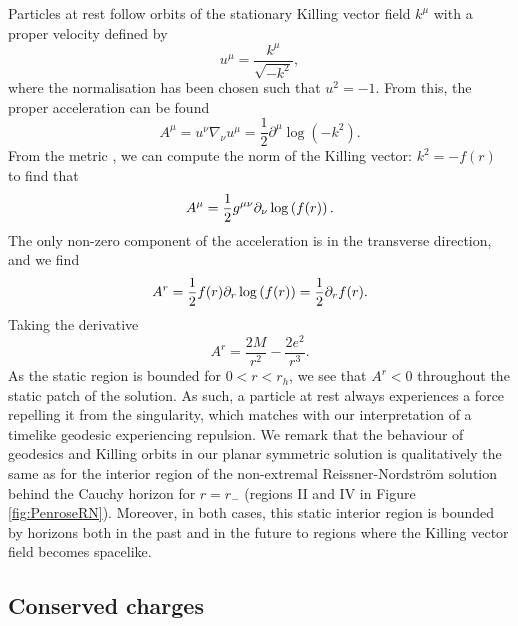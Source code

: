 Particles at rest follow orbits of the stationary Killing vector field $k^\mu$ with a proper velocity defined by
\begin{equation*}
    u^\mu = \frac{k^\mu}{\sqrt{-k^2}},
\end{equation*}
where the normalisation has been chosen such that $u^2 = -1$. From this, the proper acceleration can be found
\begin{equation}
\label{eq:propacc}
    A^\mu = u^\nu \nabla_\nu u^\mu = \frac{1}{2} \partial^\mu \log(-k^2).
\end{equation}
From the metric , we can compute the norm of the Killing vector: $k^2 = -f(r)$ to find that
\begin{equation}
\label{eq:properacccomp}
    A^\mu = \frac{1}{2} g^{\mu \nu} \partial_\nu \log \left( f(r) \right).
\end{equation}
The only non-zero component of the acceleration is in the transverse direction, and we find
\begin{equation*}
        A^r = \frac{1}{2} f(r)
 \partial_r \log \left( f(r) \right)
 = \frac{1}{2} \partial_r f(r).
\end{equation*}
Taking the derivative
\begin{equation}
A^r = \frac{2M}{r^2} - \frac{2e^2}{r^3}.
\end{equation}
As the static region is bounded for $0 < r < r_h$, we see that $A^r < 0$ throughout the static patch of the solution. As such, a particle at rest always experiences a force repelling it from the singularity, which matches with our interpretation of a timelike geodesic experiencing repulsion. We remark that the behaviour of geodesics and Killing orbits in our planar symmetric solution is qualitatively the same as for the interior region of the non-extremal Reissner-Nordstr\"om solution behind the Cauchy horizon for $r = r_-$ (regions II and IV in Figure \ref{fig:PenroseRN}). Moreover, in both cases, this static interior region is bounded by horizons both in the past and in the future to regions where the Killing vector field becomes spacelike. 

\subsection{Conserved charges}
\label{sec:emconservedcharges}


